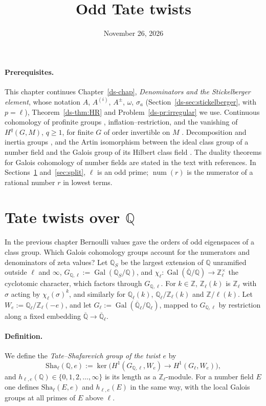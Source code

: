 \documentclass[reqno]{amsart}
\title{Odd Tate twists}
\author{}
\date{November 26, 2026}
\newcounter{chap}
\theoremstyle{definition}
\theoremstyle{plain}
\theoremstyle{remark}
\newcommand{\Z}{\mathbb{Z}}
\newcommand{\Q}{\mathbb{Q}}
\newcommand{\Zl}{\Z_\ell}
\newcommand{\Ql}{\Q_\ell}
\newcommand{\Gal}{\operatorname{Gal}}
\newcommand{\num}{\operatorname{num}}
\newcommand{\Sha}{\mathrm{Sha}}
\begin{document}
\maketitle
{}\label{chap}

\paragraph{Prerequisites.}
This chapter continues Chapter~\ref{ds-chap}, \emph{Denominators and the Stickelberger element}, whose notation \(A\), \(A^{(i)}\), \(A^\pm\), \(\omega\), \(\sigma_a\) (Section~\ref{ds-sec:stickelberger}, with \(p = \ell\)), Theorem~\ref{ds-thm:HR} and Problem~\ref{ds-pr:irregular} we use.  Continuous cohomology of profinite groups \cite[Ch.~I; Ch.~II, \S7]{NSW}, inflation--restriction, and the vanishing of \(H^q(G, M)\), \(q \ge 1\), for finite \(G\) of order invertible on \(M\) \cite[Ch.~VII--VIII]{SeL}.  Decomposition and inertia groups \cite[Ch.~I, \S9]{Ne}, and the Artin isomorphism between the ideal class group of a number field and the Galois group of its Hilbert class field \cite[Ch.~VI, \S6]{Ne}.  The duality theorems for Galois cohomology of number fields are stated in the text with references.  In Sections~\ref{sec:twists} and~\ref{sec:split}, \(\ell\) is an odd prime; \(\num(r)\) is the numerator of a rational number \(r\) in lowest terms.

\section{Tate twists over \texorpdfstring{\(\Q\)}{Q}}\label{sec:twists}

In the previous chapter Bernoulli values gave the orders of odd eigenspaces of a class group.  Which Galois cohomology groups account for the numerators and denominators of zeta values?  Let \(\Q_S\) be the largest extension of \(\Q\) unramified outside \(\ell\) and \(\infty\), \(G_{\Q,\ell} := \Gal(\Q_S/\Q)\), and \(\chi_\ell \colon \Gal(\overline{\Q}/\Q) \to \Zl^\times\) the cyclotomic character, which factors through \(G_{\Q,\ell}\).  For \(k \in \Z\), \(\Zl(k)\) is \(\Zl\) with \(\sigma\) acting by \(\chi_\ell(\sigma)^k\), and similarly for \(\Ql(k)\), \(\Ql/\Zl(k)\) and \(\Z/\ell(k)\).  Let \(W_e := \Ql/\Zl(-e)\), and let \(G_\ell := \Gal(\overline{\Q}_\ell/\Q_\ell)\), mapped to \(G_{\Q,\ell}\) by restriction along a fixed embedding \(\overline{\Q} \to \overline{\Q}_\ell\).

\paragraph{Definition.}
We define the \emph{Tate--Shafarevich group of the twist \(e\)} by
\[
  \Sha_\ell(\Q, e) := \ker\bigl( H^1(G_{\Q,\ell}, W_e) \to H^1(G_\ell, W_e) \bigr) ,
\]
and \(h_{\ell,e}(\Q) \in \{0, 1, 2, \dots, \infty\}\) is its length as a \(\Zl\)-module.  For a number field \(E\) one defines \(\Sha_\ell(E, e)\) and \(h_{\ell,e}(E)\) in the same way, with the local Galois groups at all primes of \(E\) above \(\ell\).
\end{document}
